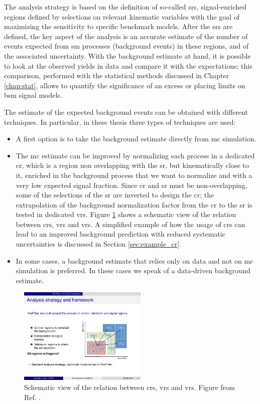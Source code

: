 The analysis strategy is based on the definition of so-called \glspl{sr}, signal-enriched regions defined by selections on relevant kinematic variables with the goal of maximizing the sensitivity to specific benchmark models. 
After the \glspl{sr} are defined, the key aspect of the analysis is an accurate estimate of the number of events expected from \gls{sm} processes (background events) in these regions, and of the associated uncertainty. 
With the background estimate at hand, it is possible to look at the observed yields in data and compare it with the expectations;
this comparison, performed with the statistical methods discussed in Chapter \ref{chap:stat}, allows to quantify the significance of an excess or placing limits on \gls{bsm} signal models.

The estimate of the expected background events can be obtained with different techniques. In particular, in these thesis three types of techniques are used:
\begin{itemize}
\item A first option is to take the background estimate directly from \gls{mc} simulation. 
\item The \gls{mc} estimate can be improved by normalizing each process in a dedicated \gls{cr}, which is a region non overlapping with the \gls{sr}, but kinematically close to it, enriched in the background process that we want to normalize and with a very low expected signal fraction. Since \gls{cr} and \gls{sr} must be non-overlapping, some of the selections of the \gls{sr} are inverted to design the \gls{cr}; the extrapolation of the background normalization factor from the \gls{cr} to the \gls{sr} is tested in dedicated \glspl{vr}. Figure \ref{fig:susy_common:CRschema} shows a schematic view of the relation between \glspl{cr}, \glspl{vr} and \glspl{vr}. A simplified example of how the usage of \glspl{cr} can lead to an improved background prediction with reduced systematic uncertainties is discussed in Section \ref{sec:example_cr}. 
\item In some cases, a background estimate that relies only on data and not on \gls{mc} simulation is preferred. In these cases we speak of a data-driven background estimate.
\end{itemize}

\begin{figure}
\centering
\includegraphics[width=0.55\textwidth]{figures/susy_common/CR_VR}
\caption{Schematic view of the relation between \glspl{cr}, \glspl{vr} and \glspl{vr}. Figure from Ref. \cite{Baak:2014wma}.}
\label{fig:susy_common:CRschema}
\end{figure}
 
